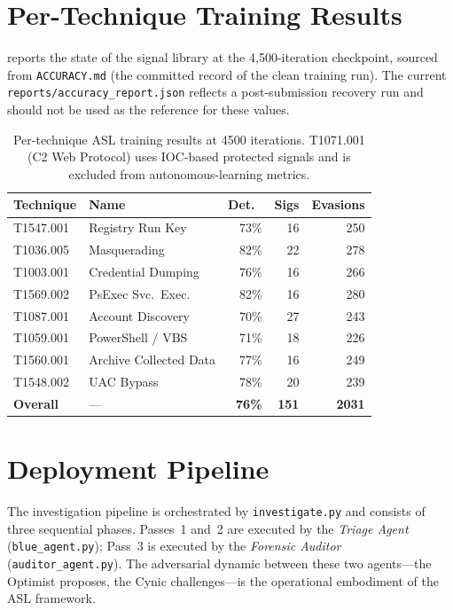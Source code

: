 \documentclass[sigconf, nonacm]{acmart}
\begin{document}
\section{Per-Technique Training Results}
\label{sec:pertech}

 reports the state of the signal library at the
4,500-iteration checkpoint, sourced from \texttt{ACCURACY.md}
(the committed record of the clean training run). The current
\texttt{reports/accuracy\_report.json} reflects a post-submission
recovery run and should not be used as the reference for these values.

\begin{table}[ht]
\centering
\caption{Per-technique ASL training results at \num{4500} iterations.
  T1071.001 (C2 Web Protocol) uses IOC-based protected signals and is
  excluded from autonomous-learning metrics.}
\label{tab:pertech}
\begin{tabular}{@{}llrrr@{}}
\toprule
Technique  & Name                   & Det.\ & Sigs & Evasions \\
\midrule
T1547.001  & Registry Run Key       & 73\%  & 16   & 250 \\
T1036.005  & Masquerading           & 82\%  & 22   & 278 \\
T1003.001  & Credential Dumping     & 76\%  & 16   & 266 \\
T1569.002  & PsExec Svc.\ Exec.    & 82\%  & 16   & 280 \\
T1087.001  & Account Discovery      & 70\%  & 27   & 243 \\
T1059.001  & PowerShell / VBS       & 71\%  & 18   & 226 \\
T1560.001  & Archive Collected Data & 77\%  & 16   & 249 \\
T1548.002  & UAC Bypass             & 78\%  & 20   & 239 \\
\midrule
\textbf{Overall} & --- & \textbf{76\%} & \textbf{151} & \textbf{2031} \\
\bottomrule
\end{tabular}
\end{table}

\section{Deployment Pipeline}
\label{sec:pipeline}

The investigation pipeline is orchestrated by \texttt{investigate.py} and
consists of three sequential phases.  Passes~1 and~2 are executed by the
\emph{Triage Agent} (\texttt{blue\_agent.py}); Pass~3 is executed by the
\emph{Forensic Auditor} (\texttt{auditor\_agent.py}).  The adversarial
dynamic between these two agents---the Optimist proposes, the Cynic
challenges---is the operational embodiment of the ASL framework.
\end{document}
